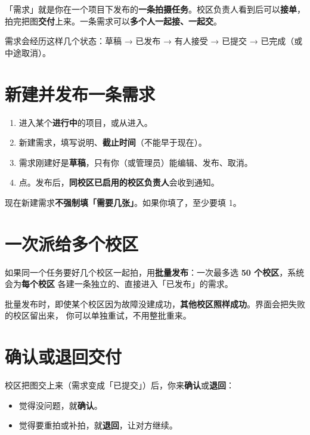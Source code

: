 \documentclass[cn,11pt,green]{elegantbook}
\begin{document}
「需求」就是你在一个项目下发布的\textbf{一条拍摄任务}。校区负责人看到后可以\textbf{接单}，
拍完把图\textbf{交付}上来。一条需求可以\textbf{多个人一起接、一起交}。

需求会经历这样几个状态：草稿 → 已发布 → 有人接受 → 已提交 → 已完成（或中途取消）。

\section{新建并发布一条需求}

\begin{stepbox}[发布单条需求]
  \begin{enumerate}
    \item 进入某个\textbf{进行中}的项目，或从进入。
    \item 新建需求，填写说明、\textbf{截止时间}（不能早于现在）。
    \item 需求刚建好是\textbf{草稿}，只有你（或管理员）能编辑、发布、取消。
    \item 点。发布后，\textbf{同校区已启用的校区负责人}会收到通知。
  \end{enumerate}
\end{stepbox}

\begin{notebox}[数量可以不填]
  现在新建需求\textbf{不强制填「需要几张」}。如果你填了，至少要填 1。
\end{notebox}

\section{一次派给多个校区}

如果同一个任务要好几个校区一起拍，用\textbf{批量发布}：一次最多选 \textbf{50 个校区}，系统会为\textbf{每个校区}
各建一条独立的、直接进入「已发布」的需求。

\begin{tipbox}[部分成功也没关系]
  批量发布时，即使某个校区因为故障没建成功，\textbf{其他校区照样成功}。界面会把失败的校区留出来，
  你可以单独重试，不用整批重来。
\end{tipbox}

\section{确认或退回交付}

校区把图交上来（需求变成「已提交」）后，你来\textbf{确认}或\textbf{退回}：

\begin{itemize}
  \item 觉得没问题，就\textbf{确认}。
  \item 觉得要重拍或补拍，就\textbf{退回}，让对方继续。
\end{itemize}
\end{document}

